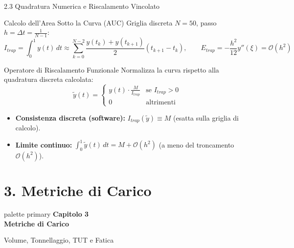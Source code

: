 \documentclass[aspectratio=169, 10pt]{beamer}
\begin{document}
\begin{frame}{2.3 Quadratura Numerica e Riscalamento Vincolato}
    \begin{block}{Calcolo dell'Area Sotto la Curva (AUC)}
        \footnotesize
        Griglia discreta $N = 50$, passo $h = \Delta t = \frac{1}{N-1}$:
        $$I_{trap} = \int_0^1 y(t)\,dt \approx \sum_{k=0}^{N-2} \frac{y(t_k) + y(t_{k+1})}{2} (t_{k+1} - t_k), \qquad E_{trap} = -\frac{h^2}{12} y''(\xi) = \mathcal{O}(h^2)$$
    \end{block}
    \begin{block}{Operatore di Riscalamento Funzionale}
        \footnotesize
        Normalizza la curva rispetto alla quadratura discreta calcolata:
        $$\tilde{y}(t) = \begin{cases} y(t) \cdot \frac{M}{I_{trap}} & \text{se } I_{trap} > 0 \\ 0 & \text{altrimenti} \end{cases}$$
        \begin{itemize}\setlength{\itemsep}{1pt}
            \item \textbf{Consistenza discreta (software):} $I_{trap}(\tilde{y}) \equiv M$ (esatta sulla griglia di calcolo).
            \item \textbf{Limite continuo:} $\int_0^1 \tilde{y}(t)\,dt = M + \mathcal{O}(h^2)$ (a meno del troncamento $\mathcal{O}(h^2)$).
        \end{itemize}
    \end{block}
\end{frame}

\section{3. Metriche di Carico}

\begin{frame}
    \vfill
    \centering
    \begin{beamercolorbox}[sep=10pt,center,shadow=true,rounded=true]{palette primary}
        {\Huge \textbf{Capitolo 3}}\\[0.3cm]
        {\LARGE \textbf{Metriche di Carico}}
    \end{beamercolorbox}
    \vspace{0.4cm}
    {\normalsize \textcolor{secondaryColor}{Volume, Tonnellaggio, TUT e Fatica}}
    \vfill
\end{frame}
\end{document}
